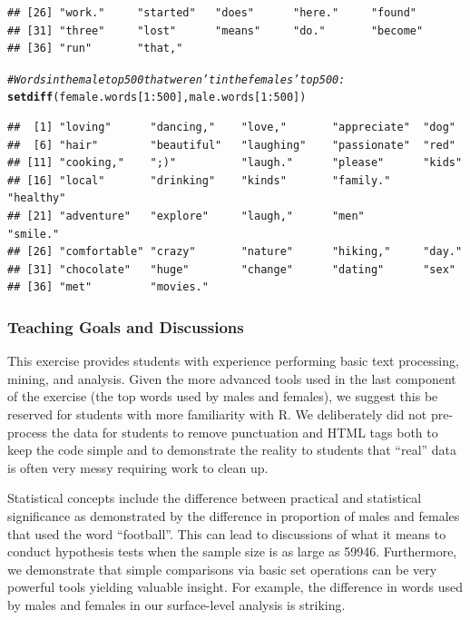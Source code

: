 \documentclass{article}\usepackage[]{graphicx}\usepackage[]{color}
\makeatletter
\newcommand{\hlnum}[1]{\textcolor[rgb]{0.686,0.059,0.569}{#1}}%
\newcommand{\hlcom}[1]{\textcolor[rgb]{0.678,0.584,0.686}{\textit{#1}}}%
\newcommand{\hlopt}[1]{\textcolor[rgb]{0,0,0}{#1}}%
\newcommand{\hlstd}[1]{\textcolor[rgb]{0.345,0.345,0.345}{#1}}%
\newcommand{\hlkwd}[1]{\textcolor[rgb]{0.737,0.353,0.396}{\textbf{#1}}}%
\newenvironment{kframe}{%
 \def\at@end@of@kframe{}%
 \ifinner\ifhmode%
  \def\at@end@of@kframe{\end{minipage}}%
  \begin{minipage}{\columnwidth}%
 \fi\fi%
 \def\FrameCommand##1{\hskip\@totalleftmargin \hskip-\fboxsep
 \colorbox{shadecolor}{##1}\hskip-\fboxsep
     \hskip-\linewidth \hskip-\@totalleftmargin \hskip\columnwidth}%
 \MakeFramed {\advance\hsize-\width
   \@totalleftmargin\z@ \linewidth\hsize
   \@setminipage}}%
 {\par\unskip\endMakeFramed%
 \at@end@of@kframe}
\newenvironment{knitrout}{}{} %
\makeatother
\begin{document}
\begin{knitrout}
\begin{kframe}
\begin{verbatim}
## [26] "work."     "started"   "does"      "here."     "found"    
## [31] "three"     "lost"      "means"     "do."       "become"   
## [36] "run"       "that,"
\end{verbatim}
\begin{alltt}
\hlcom{# Words in the male top 500 that weren't in the females' top 500:}
\hlkwd{setdiff}\hlstd{(female.words[}\hlnum{1}\hlopt{:}\hlnum{500}\hlstd{], male.words[}\hlnum{1}\hlopt{:}\hlnum{500}\hlstd{])}
\end{alltt}
\begin{verbatim}
##  [1] "loving"      "dancing,"    "love,"       "appreciate"  "dog"        
##  [6] "hair"        "beautiful"   "laughing"    "passionate"  "red"        
## [11] "cooking,"    ";)"          "laugh."      "please"      "kids"       
## [16] "local"       "drinking"    "kinds"       "family."     "healthy"    
## [21] "adventure"   "explore"     "laugh,"      "men"         "smile."     
## [26] "comfortable" "crazy"       "nature"      "hiking,"     "day."       
## [31] "chocolate"   "huge"        "change"      "dating"      "sex"        
## [36] "met"         "movies."
\end{verbatim}
\end{kframe}
\end{knitrout}




\subsubsection{Teaching Goals and Discussions}
This exercise provides students with experience performing basic text processing, mining, and analysis.  Given the more advanced tools used in the last component of the exercise (the top words used by males and females), we suggest this be reserved for students with more familiarity with R.  We deliberately did not pre-process the data for students to remove punctuation and HTML tags both to keep the code simple and to demonstrate the reality to students that ``real'' data is often very messy requiring work to clean up.

Statistical concepts include the difference between practical and statistical significance as demonstrated by the difference in proportion of males and females that used the word ``football''.  This can lead to discussions of what it means to conduct hypothesis tests when the sample size is as large as 59946.  Furthermore, we demonstrate that simple comparisons via basic set operations can be very powerful tools yielding valuable insight.  For example, the difference in words used by males and females in our surface-level analysis is striking.
\end{document}
